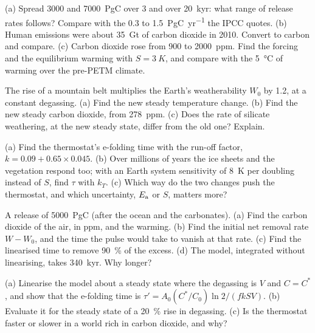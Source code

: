 \begin{exercise}[$\star\star$]\label{exo:b2:deep-time-climate:8}
(a) Spread \num{3000} and \qty{7000}{PgC} over 3 and over \qty{20}{kyr}: what range of release
rates follows? Compare with the 0.3 to \qty{1.5}{PgC.yr^{-1}} the IPCC quotes. (b) Human emissions
were about \qty{35}{Gt} of carbon dioxide in 2010. Convert to carbon and compare. (c) Carbon
dioxide rose from 900 to \qty{2000}{ppm}. Find the forcing and the equilibrium warming with $S =
\qty{3}{K}$, and compare with the \qty{5}{\celsius} of warming over the pre-PETM climate.
\end{exercise}

\begin{exercise}[$\star\star$]\label{exo:b2:deep-time-climate:9}
The rise of a mountain belt multiplies the Earth's weatherability $W_0$ by 1.2, at a constant
degassing. (a) Find the new steady temperature change. (b) Find the new steady carbon dioxide, from
\qty{278}{ppm}. (c) Does the rate of silicate weathering, at the new steady state, differ from the
old one? Explain.
\end{exercise}

\begin{exercise}[$\star\star\star$]\label{exo:b2:deep-time-climate:10}
(a) Find the thermostat's e-folding time with the run-off factor, $k = 0.09 + 0.65\times0.045$.
(b) Over millions of years the ice sheets and the vegetation respond too; with an Earth system
sensitivity of \qty{8}{K} per doubling instead of $S$, find $\tau$ with $k_T$. (c) Which way do the
two changes push the thermostat, and which uncertainty, $E_{\text a}$ or $S$, matters more?
\end{exercise}

\begin{exercise}[$\star\star\star$]\label{exo:b2:deep-time-climate:11}
A release of \qty{5000}{PgC} (after the ocean and the carbonates). (a) Find the carbon dioxide of
the air, in ppm, and the warming. (b) Find the initial net removal rate $W - W_0$, and the time the
pulse would take to vanish at that rate. (c) Find the linearised time to remove \qty{90}{\percent}
of the excess. (d) The model, integrated without linearising, takes \qty{340}{kyr}. Why longer?
\end{exercise}

\begin{exercise}[$\star\star\star$]\label{exo:b2:deep-time-climate:12}
(a) Linearise the model about a steady state where the degassing is $V$ and $C = C^*$, and show that
the e-folding time is $\tau' = A_0 (C^*/C_0)\ln 2/(f k S V)$. (b) Evaluate it for the steady state
of a \qty{20}{\percent} rise in degassing. (c) Is the thermostat faster or slower in a world rich in
carbon dioxide, and why?
\end{exercise}


